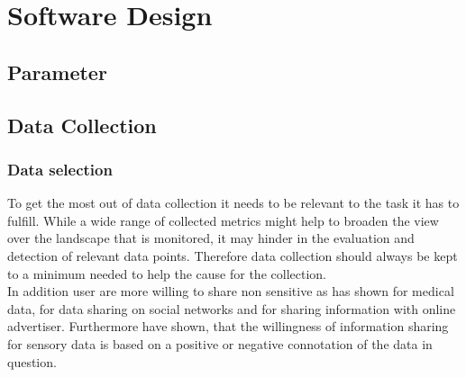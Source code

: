 \chapter{Software Design}
\label{chap:software_design}



\section{Parameter}
\label{sec:measurement:parameter}

%

\newpage


\section{Data Collection}
\label{sec:software_design:data_collection}

    \subsection{Data selection}
        \label{subsec:software_design:selection}
        To get the most out of data collection it needs to be relevant to the task it has to fulfill.
        While a wide range of collected metrics might help to broaden the view over the landscape that is monitored, it may hinder in the evaluation and detection of relevant data points. Therefore data collection should always be kept to a minimum needed to help the cause for the collection.\\
        In addition user are more willing to share non sensitive as \cite{TODO} has shown for medical data, \cite{TODO} for data sharing on social networks and \cite{TODO} for sharing information with online advertiser. Furthermore \cite{TODO} have shown, that the willingness of information sharing for sensory data is based on a positive or negative connotation of the data in question.\\
        
